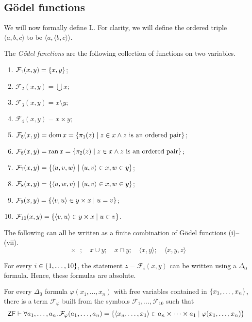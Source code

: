 \subsection{G\"odel functions}
We will now formally define \( \mathrm{L} \).
For clarity, we will define the ordered triple \( \langle a, b, c \rangle \) to be \( \langle a, \langle b, c \rangle \rangle \).
\begin{definition}
    The \emph{G\"odel functions} are the following collection of functions on two variables.
    \begin{enumerate}
        \item \( \mathcal F_1(x, y) = \qty{x, y} \);
        \item \( \mathcal F_2(x, y) = \bigcup x \);
        \item \( \mathcal F_3(x, y) = x \setminus y \);
        \item \( \mathcal F_4(x, y) = x \times y \);
        \item \( \mathcal F_5(x, y) = \operatorname{dom} x = \qty{\pi_1(z) \mid z \in x \wedge z \text{ is an ordered pair}} \);
        \item \( \mathcal F_6(x, y) = \operatorname{ran} x = \qty{\pi_2(z) \mid z \in x \wedge z \text{ is an ordered pair}} \);
        \item \( \mathcal F_7(x, y) = \qty{\langle u, v, w \rangle \mid \langle u, v \rangle \in x, w \in y} \);
        \item \( \mathcal F_8(x, y) = \qty{\langle u, w, v \rangle \mid \langle u, v \rangle \in x, w \in y} \);
        \item \( \mathcal F_9(x, y) = \qty{\langle v, u \rangle \in y \times x \mid u = v} \);
        \item \( \mathcal F_{10}(x, y) = \qty{\langle v, u \rangle \in y \times x \mid u \in v} \).
    \end{enumerate}
\end{definition}
\begin{proposition}
    The following can all be written as a finite combination of G\"odel functions (i)--(vii).
    \[ \qty{x};\quad x \cup y;\quad x \cap y;\quad \langle x, y \rangle;\quad \langle x, y, z \rangle \]
\end{proposition}
\begin{proposition}
    For every \( i \in \qty{1, \dots, 10} \), the statement \( z = \mathcal F_i(x, y) \) can be written using a \( \Delta_0 \) formula.
    Hence, these formulas are absolute.
\end{proposition}
\begin{lemma}
    For every \( \Delta_0 \) formula \( \varphi(x_1, \dots, x_n) \) with free variables contained in \( \qty{x_1, \dots, x_n} \), there is a term \( \mathcal F_\varphi \) built from the symbols \( \mathcal F_1, \dots, \mathcal F_{10} \) such that
    \[ \mathsf{ZF} \vdash \forall a_1, \dots, a_n.\, \mathcal F_\varphi(a_1, \dots, a_n) = \qty{\langle x_n, \dots, x_1 \rangle \in a_n \times \dots \times a_1 \mid \varphi(x_1, \dots, x_n)} \]
\end{lemma}
